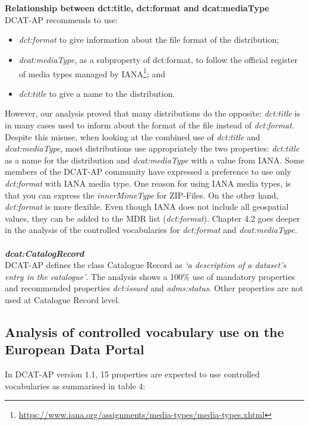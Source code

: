 \documentclass[<options>]{elsarticle}
\begin{document}
\\
\\
\textbf{Relationship between dct:title, dct:format and dcat:mediaType}\\
DCAT-AP recommends to use:
\begin{itemize}
\item \textit{dct:format} to give information about the file format of the distribution;
\item \textit{dcat:mediaType}, as a subproperty of dct:format, to follow the official register of media types managed by IANA\footnote{\href{ https://www.iana.org/assignments/media-types/media-types.xhtml}{   https://www.iana.org/assignments/media-types/media-types.xhtml}}; and
\item \textit{dct:title} to give a name to the distribution.
\end{itemize}

However, our analysis proved that many distributions do the opposite: \textit{dct:title} is in many cases used to inform about the format of the file instead of \textit{dct:format}. Despite this misuse, when looking at the combined use of \textit{dct:title} and \textit{dcat:mediaType}, most distributions use appropriately the two properties: \textit{dct:title} as a name for the distribution and \textit{dcat:mediaType} with a value from IANA. Some members of the DCAT-AP community have expressed a preference to use only \textit{dct:format} with IANA media type. One reason for using IANA media types, is that you can express the \textit{innerMimeType} for ZIP-Files. On the other hand, \textit{dct:format} is more flexible. Even though IANA does not include all geospatial values, they can be added to the MDR list (\textit{dct:format}). Chapter 4.2 goes deeper in the analysis of the controlled vocabularies for \textit{dct:format} and \textit{dcat:mediaType}. 
\\
\\
\textbf{\textit{dcat:CatalogRecord}}\\
DCAT-AP defines the class Catalogue Record as \textit{‘a description of a dataset’s entry in the catalogue’}. The analysis shows a 100\% use of mandatory properties and recommended properties \textit{dct:issued} and \textit{adms:status}. Other properties are not used at Catalogue Record level.

\subsection{Analysis of controlled vocabulary use on the European Data Portal}
In DCAT-AP version 1.1, 15 properties are expected to use controlled vocabularies as summarised in table 4: 
\end{document}
